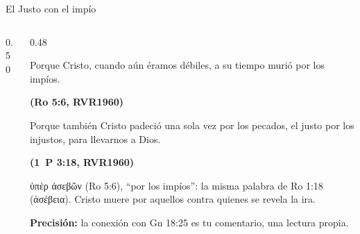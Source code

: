 \documentclass[hyperref={bookmarks=false},aspectratio=169]{beamer}
\newcommand{\grc}[1]{\foreignlanguage{ancientgreek}{#1}}
\newcommand{\fuente}[1]{\par\hfill{\upshape\bfseries\footnotesize\textcolor{azul}{#1}}}
\newcommand{\precision}[1]{{\footnotesize\color{gris}\textbf{Precisión:} #1}}
\begin{document}
\begin{frame}{El Justo con el impío}
\begin{columns}[c,onlytextwidth]
\begin{column}{0.50\textwidth}
\centering
{}
\end{column}
\begin{column}{0.48\textwidth}
\begin{cita}Porque Cristo, cuando aún éramos débiles, a su tiempo murió por los impíos.\fuente{(Ro 5:6, RVR1960)}\end{cita}
\begin{cita}Porque también Cristo padeció una sola vez por los pecados, el justo por los injustos, para llevarnos a Dios.\fuente{(1~P 3:18, RVR1960)}\end{cita}
\scriptsize\grc{ὑπὲρ ἀσεβῶν} (Ro 5:6), ``por los impíos'': la misma palabra de Ro 1:18 (\grc{ἀσέβεια}). Cristo muere por aquellos contra quienes se revela la ira.\par\smallskip
\precision{la conexión con Gn 18:25 es tu comentario, una lectura propia.}
\end{column}
\end{columns}
\end{frame}
\end{document}
